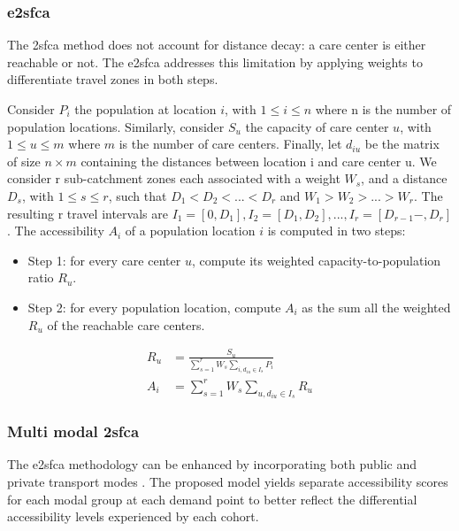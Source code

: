 \subsubsection*{\acf{e2sfca}}

The \ac{2sfca} method does not account for distance decay: a care center is either reachable or not. The \ac{e2sfca} \cite{luo_enhanced_2009} addresses this limitation by applying weights to differentiate travel zones in both steps.

Consider $P_i$ the population at location $i$, with $1 \leq i \leq n$ where n is the number of population locations. Similarly, consider $S_u$ the capacity of care center $u$, with $1 \leq u \leq m$ where $m$ is the number of care centers. Finally, let $d_{iu}$ be the matrix of size $n \times m$ containing the distances between location i and care center u. We consider r sub-catchment zones each associated with a weight $W_s$, and a distance $D_s$, with $1 \leq s \leq r$, such that $D_1 < D_2 < ... < D_r$ and $W_1 > W_2 > ... > W_r$. The resulting r travel intervals are $I_1=[0, D_1], I_2=[D_1, D_2 ], ... ,I_r=[D_{r-1}-,D_r]$. The accessibility $A_i$ of a population location $i$ is computed in two steps:

\begin{itemize}
    \item Step 1: for every care center $u$, compute its weighted capacity-to-population ratio $R_u$.
    \item Step 2: for every population location, compute $A_i$ as the sum all the weighted $R_u$ of the reachable care centers.
\end{itemize}

\begin{align}
    R_u &=  \frac{S_u}{\sum_{s=1}^{r} W_s \sum_{i, d_{iu} \in I_s} P_i} \\
    A_i &= \sum_{s=1}^{r} W_s \sum_{u, d_{iu} \in I_s} R_u
\end{align}

\subsubsection*{Multi modal \acl{2sfca}}

The \ac{e2sfca} methodology can be enhanced by incorporating both public and private transport modes \cite{langford_multi-modal_2016}. The proposed model yields separate accessibility scores for each modal group at each demand point to better reflect the differential accessibility levels experienced by each cohort.

